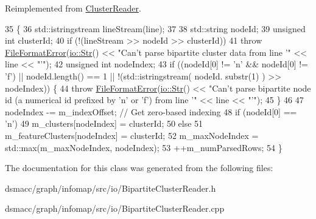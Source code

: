 Reimplemented from \mbox{\hyperlink{classClusterReader}{Cluster\+Reader}}.


\begin{DoxyCode}
35 \{
36     std::istringstream lineStream(line);
37 
38     std::string nodeId;
39     \textcolor{keywordtype}{unsigned} \textcolor{keywordtype}{int} clusterId;
40     \textcolor{keywordflow}{if} (!(lineStream >> nodeId >> clusterId))
41         \textcolor{keywordflow}{throw} \mbox{\hyperlink{classFileFormatError}{FileFormatError}}(\mbox{\hyperlink{classio_1_1Str}{io::Str}}() << \textcolor{stringliteral}{"Can't parse bipartite cluster data from
       line '"} << line << \textcolor{stringliteral}{"'"});
42     \textcolor{keywordtype}{unsigned} \textcolor{keywordtype}{int} nodeIndex;
43     \textcolor{keywordflow}{if} ((nodeId[0] != \textcolor{charliteral}{'n'} && nodeId[0] != \textcolor{charliteral}{'f'}) || nodeId.length() == 1 || !(std::istringstream( nodeId.
      substr(1) ) >> nodeIndex)) \{
44         \textcolor{keywordflow}{throw} \mbox{\hyperlink{classFileFormatError}{FileFormatError}}(\mbox{\hyperlink{classio_1_1Str}{io::Str}}() << \textcolor{stringliteral}{"Can't parse bipartite node id (a
       numerical id prefixed by 'n' or 'f') from line '"} << line << \textcolor{stringliteral}{"'"});
45     \}
46 
47     nodeIndex -= m\_indexOffset; \textcolor{comment}{// Get zero-based indexing}
48     \textcolor{keywordflow}{if} (nodeId[0] == \textcolor{charliteral}{'n'})
49         m\_clusters[nodeIndex] = clusterId;
50     \textcolor{keywordflow}{else}
51         m\_featureClusters[nodeIndex] = clusterId;
52     m\_maxNodeIndex = std::max(m\_maxNodeIndex, nodeIndex);
53     ++m\_numParsedRows;
54 \}
\end{DoxyCode}


The documentation for this class was generated from the following files\+:\begin{DoxyCompactItemize}
\item 
dsmacc/graph/infomap/src/io/Bipartite\+Cluster\+Reader.\+h\item 
dsmacc/graph/infomap/src/io/Bipartite\+Cluster\+Reader.\+cpp\end{DoxyCompactItemize}
